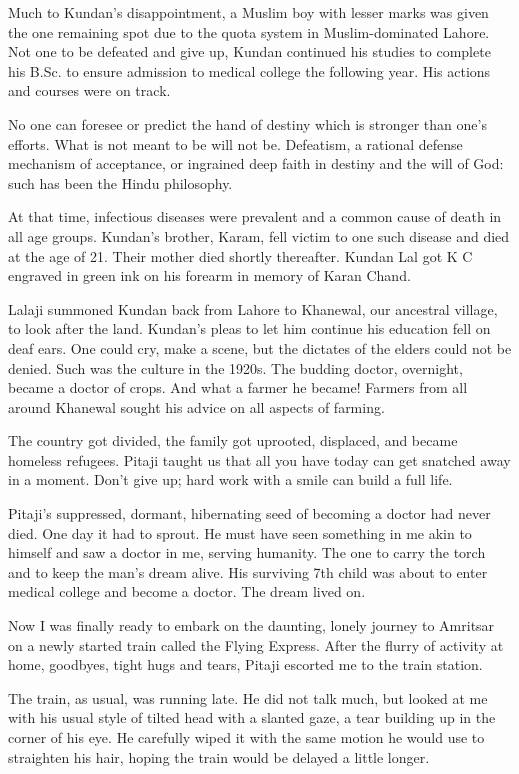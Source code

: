 Much to Kundan's disappointment, a Muslim boy with lesser marks was given
the one remaining spot due to the quota system in Muslim-dominated Lahore.
Not one to be defeated and give up, Kundan continued his studies to
complete his B.Sc. to ensure admission to medical college the following
year. His actions and courses were on track.

No one can foresee or predict the hand of destiny which is stronger than
one’s efforts. What is not meant to be will not be. Defeatism, a rational
defense mechanism of acceptance, or ingrained deep faith in destiny and
the will of God: such has been the Hindu philosophy.

At that time, infectious diseases were prevalent and a common cause of
death in all age groups. Kundan's brother, Karam, fell victim to one such
disease and died at the age of 21. Their mother died shortly thereafter.
Kundan Lal got K C engraved in green ink on his forearm in memory of Karan
Chand.

Lalaji summoned Kundan back from Lahore to Khanewal, our ancestral
village, to look after the land. Kundan’s pleas to let him continue his
education fell on deaf ears. One could cry, make a scene, but the dictates
of the elders could not be denied. Such was the culture in the 1920s. The
budding doctor, overnight, became a doctor of crops. And what a farmer he
became! Farmers from all around Khanewal sought his advice on all aspects
of farming.

The country got divided, the family got uprooted, displaced, and became
homeless refugees. Pitaji taught us that all you have today can get
snatched away in a moment. Don't give up; hard work with a smile can build
a full life.

Pitaji's suppressed, dormant, hibernating seed of becoming a doctor had
never died. One day it had to sprout. He must have seen something in me
akin to himself and saw a doctor in me, serving humanity. The one to carry
the torch and to keep the man's dream alive. His surviving 7th child was
about to enter medical college and become a doctor. The dream lived on.

Now I was finally ready to embark on the daunting, lonely journey to
Amritsar on a newly started train called the Flying Express. After the
flurry of activity at home, goodbyes, tight hugs and tears, Pitaji
escorted me to the train station.

The train, as usual, was running late. He did not talk much, but looked at
me with his usual style of tilted head with a slanted gaze, a tear
building up in the corner of his eye. He carefully wiped it with the same
motion he would use to straighten his hair, hoping the train would be
delayed a little longer.

